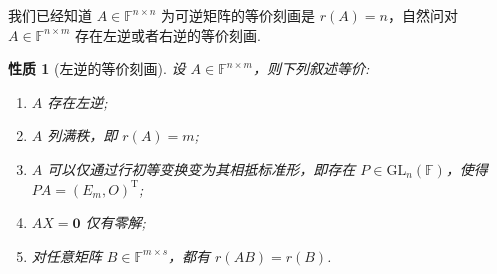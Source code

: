 \documentclass[10pt,openany]{article}
\theoremstyle{thmstyle} %
\theoremstyle{defstyle} %
\theoremstyle{prostyle} %
\newtheorem{property}[theorem]{性质}
\theoremstyle{exastyle}
\theoremstyle{remstyle}
\newcommand{\T}{^{\text{T}}}
\newcommand{\F}{\mathbb{F}}
\newcommand{\gfn}{\text{GL}_n(\mathbb{F})}
\newcommand{\n}{^{n \times n}}
\newcommand{\nm}{^{n \times m}}
\begin{document}
我们已经知道 \( A \in \F\n \) 为可逆矩阵的等价刻画是 \( r(A)=n \)，自然问对 \( A \in \F\nm \) 存在左逆或者右逆的等价刻画.

\begin{property}[左逆的等价刻画] \label{3.2.22}
	设 \( A \in \F\nm \)，则下列叙述等价:
	\begin{enumerate}[(1)]
		\item \( A \) 存在左逆;
		\item \( A \) 列满秩，即 \( r(A)=m \);
		\item \( A \) 可以仅通过行初等变换变为其相抵标准形，即存在 \( P \in \gfn \)，使得 \( PA=(E_m,O)\T \);
		\item \( AX=\bm{0} \) 仅有零解;
		\item 对任意矩阵 \( B \in \F^{m \times s} \)，都有 \(  r(AB)=r(B) \).
	\end{enumerate}
\end{property}
\end{document}
